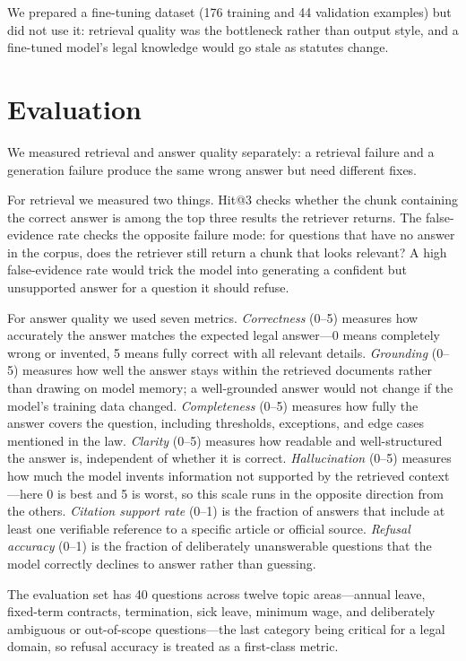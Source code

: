\documentclass[fleqn,moreauthors,10pt]{ds_report}
\begin{document}
We prepared a fine-tuning dataset (176 training and 44 validation examples) but did not use it: retrieval quality was the bottleneck rather than output style, and a fine-tuned model's legal knowledge would go stale as statutes change.

\section*{Evaluation}

We measured retrieval and answer quality separately: a retrieval failure and a generation failure produce the same wrong answer but need different fixes.

For retrieval we measured two things.
Hit@3 checks whether the chunk containing the correct answer is among the top three results the retriever returns.
The false-evidence rate checks the opposite failure mode: for questions that have no answer in the corpus, does the retriever still return a chunk that looks relevant?
A high false-evidence rate would trick the model into generating a confident but unsupported answer for a question it should refuse.

For answer quality we used seven metrics.
\textit{Correctness} (0--5) measures how accurately the answer matches the expected legal answer---0 means completely wrong or invented, 5 means fully correct with all relevant details.
\textit{Grounding} (0--5) measures how well the answer stays within the retrieved documents rather than drawing on model memory; a well-grounded answer would not change if the model's training data changed.
\textit{Completeness} (0--5) measures how fully the answer covers the question, including thresholds, exceptions, and edge cases mentioned in the law.
\textit{Clarity} (0--5) measures how readable and well-structured the answer is, independent of whether it is correct.
\textit{Hallucination} (0--5) measures how much the model invents information not supported by the retrieved context---here 0 is best and 5 is worst, so this scale runs in the opposite direction from the others.
\textit{Citation support rate} (0--1) is the fraction of answers that include at least one verifiable reference to a specific article or official source.
\textit{Refusal accuracy} (0--1) is the fraction of deliberately unanswerable questions that the model correctly declines to answer rather than guessing.

The evaluation set has 40 questions across twelve topic areas---annual leave, fixed-term contracts, termination, sick leave, minimum wage, and deliberately ambiguous or out-of-scope questions---the last category being critical for a legal domain, so refusal accuracy is treated as a first-class metric.
\end{document}
